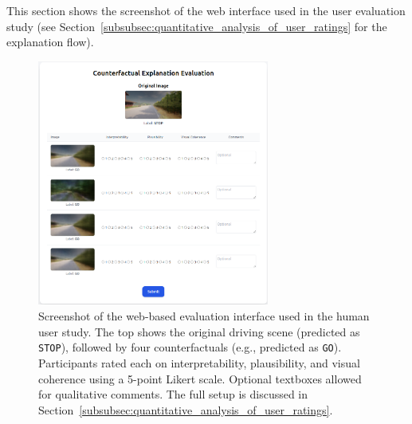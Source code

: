 This section shows the screenshot of the web interface used in the user evaluation study (see Section~\ref{subsubsec:quantitative_analysis_of_user_ratings} for the explanation flow).

\vspace{-0.5em}

\begin{figure}[h]
    \centering
    \captionsetup{font=small,skip=4pt}
    \includegraphics[width=0.68\textwidth]{img/web_app_screenshots/grading.png}
    \caption[Web interface: counterfactual rating task]{%
Screenshot of the web-based evaluation interface used in the human user study. The top shows the original driving scene (predicted as \texttt{STOP}), followed by four counterfactuals (e.g., predicted as \texttt{GO}). Participants rated each on interpretability, plausibility, and visual coherence using a 5-point Likert scale. Optional textboxes allowed for qualitative comments. The full setup is discussed in Section~\ref{subsubsec:quantitative_analysis_of_user_ratings}.}
    \label{fig:app:grading}
\end{figure}


